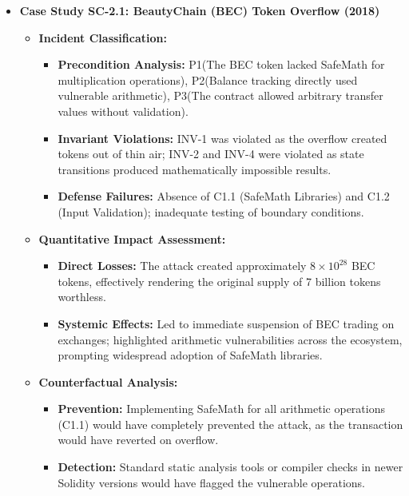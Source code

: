 \begin{itemize}
\item \textbf{Case Study SC-2.1: BeautyChain (BEC) Token Overflow (2018)}
    \begin{itemize}
    \item \textbf{Incident Classification:}
        \begin{itemize}
        \item \textbf{Precondition Analysis:} P1\checkmark (The BEC token lacked SafeMath for multiplication operations), P2\checkmark (Balance tracking directly used vulnerable arithmetic), P3\checkmark (The contract allowed arbitrary transfer values without validation).
        \item \textbf{Invariant Violations:} INV-1 was violated as the overflow created tokens out of thin air; INV-2 and INV-4 were violated as state transitions produced mathematically impossible results.
        \item \textbf{Defense Failures:} Absence of C1.1 (SafeMath Libraries) and C1.2 (Input Validation); inadequate testing of boundary conditions.
        \end{itemize}
    
    \item \textbf{Quantitative Impact Assessment:}
        \begin{itemize}
        \item \textbf{Direct Losses:} The attack created approximately $8 \times 10^{28}$ BEC tokens, effectively rendering the original supply of 7 billion tokens worthless.
        \item \textbf{Systemic Effects:} Led to immediate suspension of BEC trading on exchanges; highlighted arithmetic vulnerabilities across the ecosystem, prompting widespread adoption of SafeMath libraries.
        \end{itemize}
    
    \item \textbf{Counterfactual Analysis:}
        \begin{itemize}
        \item \textbf{Prevention:} Implementing SafeMath for all arithmetic operations (C1.1) would have completely prevented the attack, as the transaction would have reverted on overflow.
        \item \textbf{Detection:} Standard static analysis tools or compiler checks in newer Solidity versions would have flagged the vulnerable operations.
        \end{itemize}
    \end{itemize}
\end{itemize}

